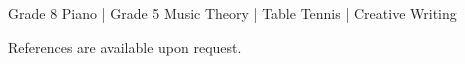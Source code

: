 
\vspace{2mm}

Grade 8 Piano | Grade 5 Music Theory | Table Tennis | Creative Writing

\vspace{6mm}

References are available upon request.